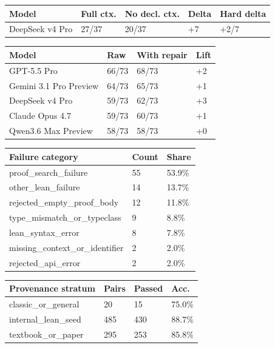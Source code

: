 \begin{tabular}{lllll}
\toprule
Model & Full ctx. & No decl. ctx. & Delta & Hard delta \\
\midrule
DeepSeek v4 Pro & 27/37 & 20/37 & +7 & +2/7 \\
\bottomrule
\end{tabular}



\begin{tabular}{llll}
\toprule
Model & Raw & With repair & Lift \\
\midrule
GPT-5.5 Pro & 66/73 & 68/73 & +2 \\
Gemini 3.1 Pro Preview & 64/73 & 65/73 & +1 \\
DeepSeek v4 Pro & 59/73 & 62/73 & +3 \\
Claude Opus 4.7 & 59/73 & 60/73 & +1 \\
Qwen3.6 Max Preview & 58/73 & 58/73 & +0 \\
\bottomrule
\end{tabular}



\begin{tabular}{lll}
\toprule
Failure category & Count & Share \\
\midrule
proof\_search\_failure & 55 & 53.9\% \\
other\_lean\_failure & 14 & 13.7\% \\
rejected\_empty\_proof\_body & 12 & 11.8\% \\
type\_mismatch\_or\_typeclass & 9 & 8.8\% \\
lean\_syntax\_error & 8 & 7.8\% \\
missing\_context\_or\_identifier & 2 & 2.0\% \\
rejected\_api\_error & 2 & 2.0\% \\
\bottomrule
\end{tabular}



\begin{tabular}{llll}
\toprule
Provenance stratum & Pairs & Passed & Acc. \\
\midrule
classic\_or\_general & 20 & 15 & 75.0\% \\
internal\_lean\_seed & 485 & 430 & 88.7\% \\
textbook\_or\_paper & 295 & 253 & 85.8\% \\
\bottomrule
\end{tabular}
